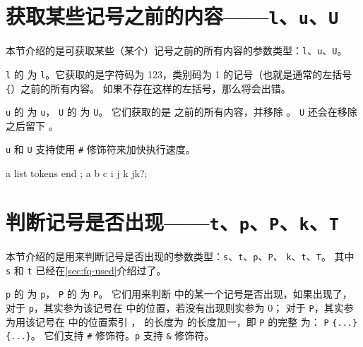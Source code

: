 \documentclass[openany]{book}
\begin{document}
\section{获取某些记号之前的内容——\texttt l、\texttt u、\texttt U}

本节介绍的是可获取某些（某个）记号之前的所有内容的参数类型：\texttt l、\texttt u、\texttt U。

\texttt l 的  为 \verb|l|。它获取的是字符码为 123，类别码为 1 
的记号（也就是通常的左括号 \verb|{|）之前的所有内容。\iffalse}\fi %
如果不存在这样的左括号，那么将会出错。

\texttt u 的  为 \verb|u|，
\texttt U 的  为 \verb|U|。
它们获取的是  之前的所有内容，并移除 。
\texttt U 还会在移除  之后留下 。

\texttt u 和 \texttt U 支持使用 \texttt\# 修饰符来加快执行速度。

\begin{examcode}{}
\DeclareEKeysCommand {} {\detokenize{[#1|#2]}}
\DeclareEKeysCommand {} {\detokenize{[#1|#2]}}
\ttfamily\obeylines
\faa a list tokens \relax end \relax{};
\fbb a b c i j k jk{?};
\end{examcode}

\section{判断记号是否出现——\texttt t、\texttt p、\texttt P、\texttt k、\texttt T}

本节介绍的是用来判断记号是否出现的参数类型：\texttt s、\texttt t、\texttt p、\texttt P、
\texttt k、\texttt t、\texttt T。
其中 \texttt s 和 \texttt t 已经在\cref{sec:fq-used}介绍过了。

\texttt p 的  为 \verb|p|，
\texttt P 的  为 \verb|P|。
它们用来判断  中的某一个记号是否出现，如果出现了，
对于 \texttt p，其实参为该记号在  中的位置，若没有出现则实参为 0；
对于 \texttt P，其实参为用该记号在  中的位置索引 ，
 的长度为  的长度加一，即 \texttt P 的完整 
 为：
\verb|P| \texttt{\{...\}
\{...\}}。
它们支持 \texttt\# 修饰符。\texttt p 支持 \texttt\& 修饰符。
\end{document}
